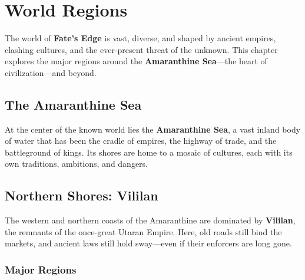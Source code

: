 
\chapter{World Regions}

The world of \textbf{Fate's Edge} is vast, diverse, and shaped by ancient empires, clashing cultures, and the ever-present threat of the unknown. This chapter explores the major regions around the \textbf{Amaranthine Sea}—the heart of civilization—and beyond.

\section{The Amaranthine Sea}

At the center of the known world lies the \textbf{Amaranthine Sea}, a vast inland body of water that has been the cradle of empires, the highway of trade, and the battleground of kings. Its shores are home to a mosaic of cultures, each with its own traditions, ambitions, and dangers.

\section{Northern Shores: Vililan}

The western and northern coasts of the Amaranthine are dominated by \textbf{Vililan}, the remnants of the once-great Utaran Empire. Here, old roads still bind the markets, and ancient laws still hold sway—even if their enforcers are long gone.

\subsection*{Major Regions}


